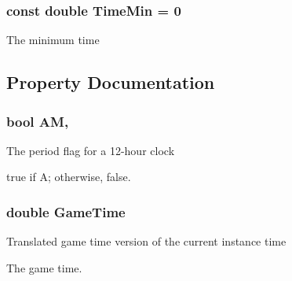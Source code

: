 \subsubsection[{Time\+Min}]{\setlength{\rightskip}{0pt plus 5cm}const double Time\+Min = 0}\label{structOTA_1_1Command_1_1WorldTime_a9e4a84053d1c6c3760964fdbd19fc28c}


The minimum time 



\subsection{Property Documentation}
\hypertarget{structOTA_1_1Command_1_1WorldTime_a73feb466eb3d31450be8df9849a6ff3f}{}
\subsubsection[{A\+M}]{\setlength{\rightskip}{0pt plus 5cm}bool A\+M\hspace{0.3cm}{\ttfamily [get]}, {\ttfamily [set]}}\label{structOTA_1_1Command_1_1WorldTime_a73feb466eb3d31450be8df9849a6ff3f}


The period flag for a 12-\/hour clock 

{\ttfamily true} if A; otherwise, {\ttfamily false}.\hypertarget{structOTA_1_1Command_1_1WorldTime_a42cec171058685931def95994647cf1f}{}
\subsubsection[{Game\+Time}]{\setlength{\rightskip}{0pt plus 5cm}double Game\+Time\hspace{0.3cm}{\ttfamily [get]}}\label{structOTA_1_1Command_1_1WorldTime_a42cec171058685931def95994647cf1f}


Translated game time version of the current instance time 

The game time.\hypertarget{structOTA_1_1Command_1_1WorldTime_aa3de14e3a386da7f7f588a6e0185e0d0}{}
